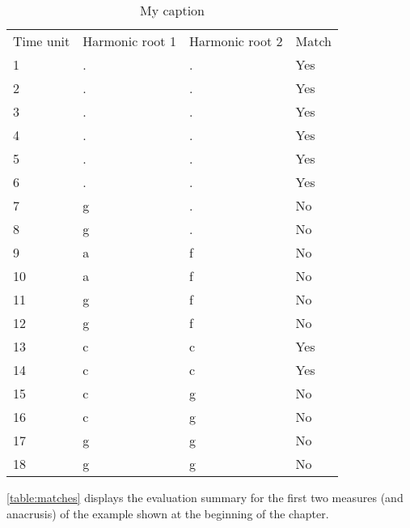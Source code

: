 		\begin{table}[]
		\centering
		\begin{tabular}{llll}
		Time unit & Harmonic root 1 & Harmonic root 2 & Match \\
		1 & . & . & Yes \\
		2 & . & . & Yes \\
		3 & . & . & Yes \\
		4 & . & . & Yes \\
		5 & . & . & Yes \\
		6 & . & . & Yes \\
		7 & g & . & No \\
		8 & g & . & No \\
		9 & a & f & No \\
		10 & a & f & No \\
		11 & g & f & No \\
		12 & g & f & No \\
		13 & c & c & Yes \\
		14 & c & c & Yes \\
		15 & c & g & No \\
		16 & c & g & No \\
		17 & g & g & No \\
		18 & g & g & No
		\end{tabular}
		\caption{My caption}
		\label{table:matches}
		\end{table}

		\autoref{table:matches} displays the evaluation summary for the first two measures (and anacrusis) of the example shown at the beginning of the chapter.

\newpage

